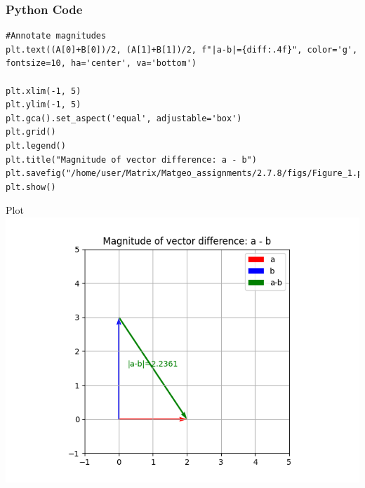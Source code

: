 \documentclass{beamer}
\begin{document}
\begin{frame}[fragile]
    \frametitle{Python Code}
    \begin{lstlisting}
#Annotate magnitudes
plt.text((A[0]+B[0])/2, (A[1]+B[1])/2, f"|a-b|={diff:.4f}", color='g', fontsize=10, ha='center', va='bottom')

plt.xlim(-1, 5)
plt.ylim(-1, 5)
plt.gca().set_aspect('equal', adjustable='box')
plt.grid()
plt.legend()
plt.title("Magnitude of vector difference: a - b")
plt.savefig("/home/user/Matrix/Matgeo_assignments/2.7.8/figs/Figure_1.png")
plt.show()
    \end{lstlisting}
\end{frame}

\begin{frame}{Plot}
    \centering
    \includegraphics[width=\columnwidth, height=0.8\textheight, keepaspectratio]{figs/Figure_1.png}     
\end{frame}
\end{document}

